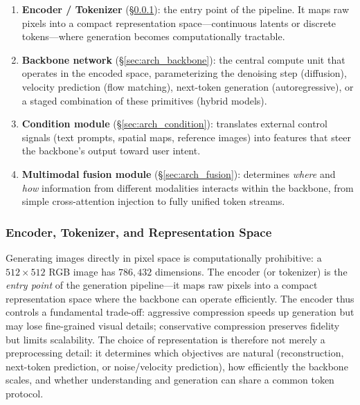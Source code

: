 \begin{enumerate}[leftmargin=*,itemsep=2pt]
    \item \textbf{Encoder / Tokenizer} (\S\ref{sec:arch_encoder}): the entry point of the pipeline. It maps raw pixels into a compact representation space---continuous latents or discrete tokens---where generation becomes computationally tractable.
    \item \textbf{Backbone network} (\S\ref{sec:arch_backbone}): the central compute unit that operates in the encoded space, parameterizing the denoising step (diffusion), velocity prediction (flow matching), next-token generation (autoregressive), or a staged combination of these primitives (hybrid models).
    \item \textbf{Condition module} (\S\ref{sec:arch_condition}): translates external control signals (text prompts, spatial maps, reference images) into features that steer the backbone's output toward user intent.
    \item \textbf{Multimodal fusion module} (\S\ref{sec:arch_fusion}): determines \emph{where} and \emph{how} information from different modalities interacts within the backbone, from simple cross-attention injection to fully unified token streams.
\end{enumerate}






\subsubsection{Encoder, Tokenizer, and Representation Space}
\label{sec:arch_encoder}

Generating images directly in pixel space is computationally prohibitive: a $512 \times 512$ RGB image has $786{,}432$ dimensions. The encoder (or tokenizer) is the \emph{entry point} of the generation pipeline---it maps raw pixels into a compact representation space where the backbone can operate efficiently. The encoder thus controls a fundamental trade-off: aggressive compression speeds up generation but may lose fine-grained visual details; conservative compression preserves fidelity but limits scalability. The choice of representation is therefore not merely a preprocessing detail: it determines which objectives are natural (reconstruction, next-token prediction, or noise/velocity prediction), how efficiently the backbone scales, and whether understanding and generation can share a common token protocol.

